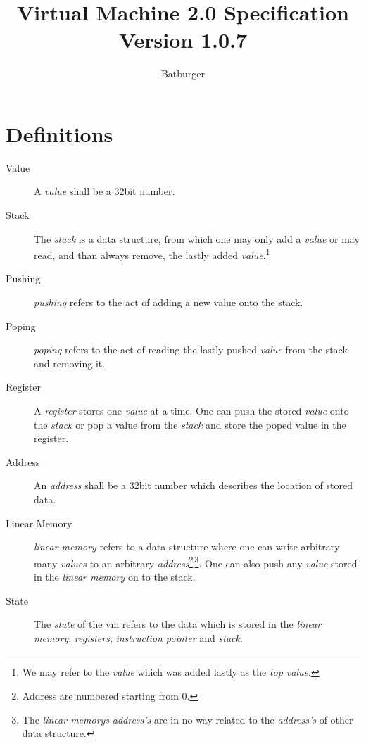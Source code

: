 \documentclass[10pt,a4paper]{article}
\author{Batburger}
\title{Virtual Machine 2.0 Specification \\ \small Version 1.0.7}
\begin{document}
	\tt
	
	\maketitle
	\section{Definitions}
	\label{definitions}
	\begin{description}
		\item[Value] A \textit{value} shall be a 32bit number.
		
		\item[Stack] The \textit{stack} is a data structure, from which one may only add a \textit{value} or may read, and than always remove, the lastly added \textit{value}.\footnote{We may refer to the \textit{value} which was added lastly as the \textit{top value}.} 

		\item[Pushing] \textit{pushing} refers to the act of adding a new value onto the stack.
		
		\item[Poping] \textit{poping} refers to the act of reading the lastly pushed	 \textit{value} from the stack and removing it.

		\item[Register] A \textit{register} stores one \textit{value} at a time. One can push the stored \textit{value} onto the \textit{stack} or pop a value from the \textit{stack} and store the poped value in the register.
		
		\item[Address] An \textit{address} shall be a 32bit number which describes the location of stored data.  		
		
		\item[Linear Memory] \textit{linear memory} refers to a data structure where one can write arbitrary many \textit{values} to an arbitrary \textit{address}\footnote{Address are numbered starting from 0.}\,\footnote{The \textit{linear memorys} \textit{address's} are in no way related to the \textit{address's} of other data structure.}. One can also push any \textit{value} stored in the \textit{linear memory} on to the stack.
		
		\item[State] The \textit{state} of the vm refers to the data which is stored in the \textit{linear memory}, \textit{registers}, \textit{instruction pointer} and \textit{stack}.		
		

\end{description}
\end{document}
